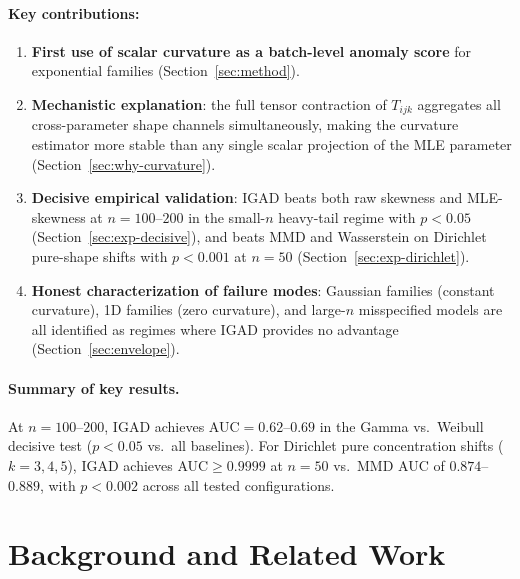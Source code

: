 \documentclass[12pt]{article}
\begin{document}
\paragraph{Key contributions:}
\begin{enumerate}
  \item \textbf{First use of scalar curvature as a batch-level anomaly score} for
        exponential families (Section~\ref{sec:method}).

  \item \textbf{Mechanistic explanation}: the full tensor contraction of $T_{ijk}$
        aggregates all cross-parameter shape channels simultaneously, making the
        curvature estimator more stable than any single scalar projection of the
        MLE parameter (Section~\ref{sec:why-curvature}).

  \item \textbf{Decisive empirical validation}: IGAD beats both raw skewness and
        MLE-skewness at $n=100$--$200$ in the small-$n$ heavy-tail regime with
        $p<0.05$ (Section~\ref{sec:exp-decisive}), and beats MMD and Wasserstein
        on Dirichlet pure-shape shifts with $p<0.001$ at $n=50$
        (Section~\ref{sec:exp-dirichlet}).

  \item \textbf{Honest characterization of failure modes}: Gaussian families
        (constant curvature), 1D families (zero curvature), and large-$n$
        misspecified models are all identified as regimes where IGAD provides no
        advantage (Section~\ref{sec:envelope}).
\end{enumerate}

\paragraph{Summary of key results.}
At $n=100$--$200$, IGAD achieves AUC$=0.62$--$0.69$ in the Gamma vs.\ Weibull
decisive test ($p<0.05$ vs.\ all baselines). For Dirichlet pure concentration
shifts ($k=3,4,5$), IGAD achieves AUC$\geq 0.9999$ at $n=50$ vs.\ MMD AUC of
$0.874$--$0.889$, with $p<0.002$ across all tested configurations.

\section{Background and Related Work}
\end{document}
